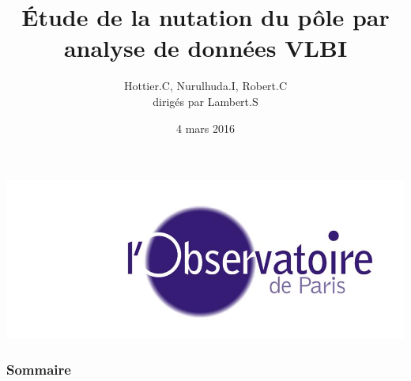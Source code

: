 \documentclass[french]{beamer}
\title[Soutenance MT3]{Étude de la nutation du pôle par analyse de données VLBI}
\author[Hottier.C, Nurulhuda.I, Robert.C]{Hottier.C, Nurulhuda.I, Robert.C\\dirigés par Lambert.S}
\date{4 mars 2016}
\begin{document}
\begin{frame}
  \maketitle
  \begin{center}
    \includegraphics[height=0.20\textheight]{Figures/siteon0.jpg}
  \end{center}
\end{frame}

\begin{frame}
  \frametitle{Sommaire}
  \tableofcontents
\end{frame}

















\end{document}
